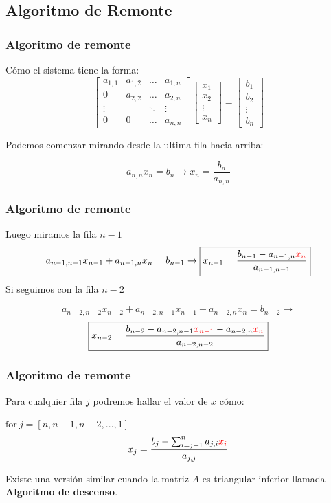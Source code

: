 \documentclass[xcolor=svgnames]{beamer} %
\theoremstyle{plain}
\renewcommand{\textbf}[1]{{\bfseries\textcolor{redUnq2}{#1}}}
\theoremstyle{definition}
\begin{document}
\subsection{Algoritmo de Remonte}

\begin{frame}
\frametitle{Algoritmo de remonte}

Cómo el sistema tiene la forma:
$$ \begin{bmatrix}
a_{1,1} & a_{1,2} 	& \dots 	 	& a_{1,n} \\
0       & a_{2,2} 	& \dots	 	& a_{2,n} \\
\vdots 	& 		  	& \ddots	 	& \vdots \\
0 		& 0			& \dots 		& a_{n,n}
\end{bmatrix} \begin{bmatrix}
x_1\\
x_2\\
\vdots\\
x_n
\end{bmatrix} =\begin{bmatrix}
b_1\\
b_2\\
\vdots\\
b_n
\end{bmatrix}$$

Podemos comenzar mirando desde la ultima fila hacia arriba:

$$ a_{n,n} x_n = b_n \rightarrow \boxed{x_n = \frac{b_n}{a_{n,n}}}$$ 

\end{frame}



\begin{frame}
\frametitle{Algoritmo de remonte}
Luego miramos la fila $n-1$
$$a_{n-1,n-1} x_{n-1} +a_{n-1,n} x_n = b_{n-1} \rightarrow
\boxed{ x_{n-1} = \frac{b_{n-1} - a_{n-1,n} {\color{red}x_n}}{a_{n-1,n-1}} }$$
Si seguimos con la fila $n-2$

$$a_{n-2,n-2} x_{n-2} +a_{n-2,n-1} x_{n-1} +a_{n-2,n} x_{n} = b_{n-2} \rightarrow$$
$$\boxed{x_{n-2} = \frac{b_{n-2} -a_{n-2,n-1} {\color{red}x_{n-1}} - a_{n-2,n} {\color{red}x_n} } {a_{n-2,n-2}}   } $$
\end{frame}

\begin{frame}
\frametitle{Algoritmo de remonte}
 Para cualquier fila $j$ podremos hallar el valor de $x$ cómo:
 
$ \text{for} \ j = [n,n-1,n-2,...,1]$
 $$ x_j = \frac{ b_j - \sum_{i=j+1}^{n} a_{j,i} {\color{red}x_i}}{ a_{j,j} }$$


Existe una versión similar cuando la matriz $A$ es triangular inferior llamada
\textbf{Algoritmo de descenso}.
\end{frame}
\end{document}
